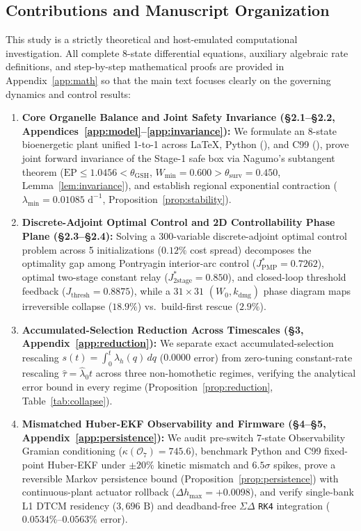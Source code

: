 \documentclass[11pt]{article}
\theoremstyle{plain}
\theoremstyle{remark}
\begin{document}
\subsection{Contributions and Manuscript Organization}
This study is a strictly theoretical and host-emulated computational investigation. All complete 8-state differential equations, auxiliary algebraic rate definitions, and step-by-step mathematical proofs are provided in Appendix~\ref{app:math} so that the main text focuses clearly on the governing dynamics and control results:
\begin{enumerate}
  \item \textbf{Core Organelle Balance and Joint Safety Invariance (\S2.1--\S2.2, Appendices~\ref{app:model}--\ref{app:invariance}):} We formulate an 8-state bioenergetic plant unified 1-to-1 across \LaTeX, Python (), and C99 (), prove joint forward invariance of the Stage-1 safe box via Nagumo's subtangent theorem ($\mathrm{EP} \le 1.0456 < \theta_{\mathrm{GSH}}$, $W_{\min} = 0.600 > \theta_{\mathrm{surv}} = 0.450$, Lemma~\ref{lem:invariance}), and establish regional exponential contraction ($\lambda_{\min} = 0.01085\text{ d}^{-1}$, Proposition~\ref{prop:stability}).
  \item \textbf{Discrete-Adjoint Optimal Control and 2D Controllability Phase Plane (\S2.3--\S2.4):} Solving a 300-variable discrete-adjoint optimal control problem across 5 initializations ($0.12\%$ cost spread) decomposes the optimality gap among Pontryagin interior-arc control ($J_{\mathrm{PMP}}^* = 0.7262$), optimal two-stage constant relay ($J_{\mathrm{2stage}}^* = 0.850$), and closed-loop threshold feedback ($J_{\mathrm{thresh}} = 0.8875$), while a $31 \times 31$ $(W_0, k_{\mathrm{dmg}})$ phase diagram maps irreversible collapse ($18.9\%$) vs.\ build-first rescue ($2.9\%$).
  \item \textbf{Accumulated-Selection Reduction Across Timescales (\S3, Appendix~\ref{app:reduction}):} We separate exact accumulated-selection rescaling $s(t) = \int_0^t \lambda_h(q)\,dq$ ($0.0000$ error) from zero-tuning constant-rate rescaling $\hat{\tau} = \hat{\lambda}_0 t$ across three non-homothetic regimes, verifying the analytical error bound in every regime (Proposition~\ref{prop:reduction}, Table~\ref{tab:collapse}).
  \item \textbf{Mismatched Huber-EKF Observability and  Firmware (\S4--\S5, Appendix~\ref{app:persistence}):} We audit pre-switch 7-state Observability Gramian conditioning ($\kappa(\mathcal{O}_7) = 745.6$), benchmark Python and C99 fixed-point Huber-EKF under $\pm 20\%$ kinetic mismatch and $6.5\sigma$ spikes, prove a reversible Markov persistence bound (Proposition~\ref{prop:persistence}) with continuous-plant actuator rollback ($\Delta h_{\max} = +0.0098$), and verify single-bank L1 DTCM residency ($3{,}696\text{ B}$) and deadband-free $\Sigma\Delta$ \texttt{RK4} integration ($0.0534\%\text{--}0.0563\%$ error).
\end{enumerate}
\end{document}
